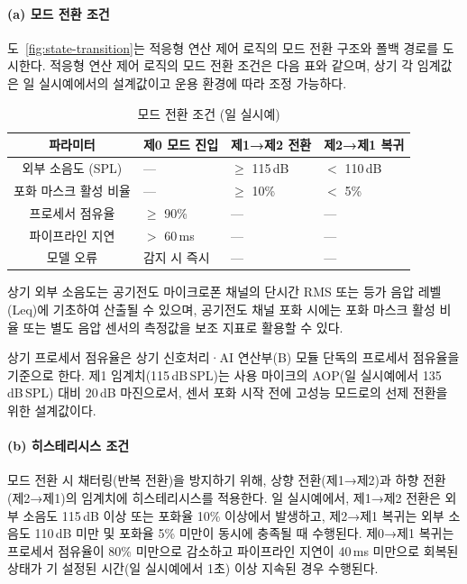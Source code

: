 \documentclass{article}
\begin{document}
\paragraph{(a) 모드 전환 조건}

도~\ref{fig:state-transition}는 적응형 연산 제어 로직의 모드 전환 구조와 폴백 경로를 도시한다. 적응형 연산 제어 로직의 모드 전환 조건은 다음 표와 같으며, 상기 각 임계값은 일 실시예에서의 설계값이고 운용 환경에 따라 조정 가능하다.

\begin{table}[H]
    \centering
    \renewcommand{\arraystretch}{1.3}
    \begin{tabular}{c|l|l|l}
        \hline
        \textbf{파라미터} & \textbf{제0 모드 진입} & \textbf{제1→제2 전환} & \textbf{제2→제1 복귀} \\
        \hline\hline
        외부 소음도 (SPL) & — & $\geq$ 115\,dB & $<$ 110\,dB \\
        \hline
        포화 마스크 활성 비율 & — & $\geq$ 10\% & $<$ 5\% \\
        \hline
        프로세서 점유율 & $\geq$ 90\% & — & — \\
        \hline
        파이프라인 지연 & $>$ 60\,ms & — & — \\
        \hline
        모델 오류 & 감지 시 즉시 & — & — \\
        \hline
    \end{tabular}
    \caption{모드 전환 조건 (일 실시예)}
\end{table}

상기 외부 소음도는 공기전도 마이크로폰 채널의 단시간 RMS 또는 등가 음압 레벨(Leq)에 기초하여 산출될 수 있으며, 공기전도 채널 포화 시에는 포화 마스크 활성 비율 또는 별도 음압 센서의 측정값을 보조 지표로 활용할 수 있다.

상기 프로세서 점유율은 상기 신호처리·AI 연산부(B) 모듈 단독의 프로세서 점유율을 기준으로 한다. 제1 임계치(115\,dB\,SPL)는 사용 마이크의 AOP(일 실시예에서 135\,dB\,SPL) 대비 20\,dB 마진으로서, 센서 포화 시작 전에 고성능 모드로의 선제 전환을 위한 설계값이다.

\paragraph{(b) 히스테리시스 조건}

모드 전환 시 채터링(반복 전환)을 방지하기 위해, 상향 전환(제1→제2)과 하향 전환(제2→제1)의 임계치에 히스테리시스를 적용한다. 일 실시예에서, 제1→제2 전환은 외부 소음도 115\,dB 이상 또는 포화율 10\% 이상에서 발생하고, 제2→제1 복귀는 외부 소음도 110\,dB 미만 및 포화율 5\% 미만이 동시에 충족될 때 수행된다. 제0→제1 복귀는 프로세서 점유율이 80\% 미만으로 감소하고 파이프라인 지연이 40\,ms 미만으로 회복된 상태가 기 설정된 시간(일 실시예에서 1초) 이상 지속된 경우 수행된다.
\end{document}
